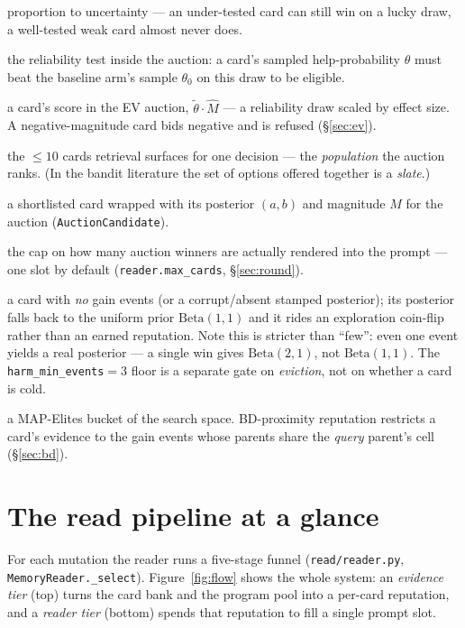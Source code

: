 \documentclass[11pt]{article}
\newcommand{\code}[1]{\texttt{\small #1}}
\newcommand{\Beta}{\mathrm{Beta}}
\begin{document}
\begin{description}[leftmargin=1.4em, itemsep=1.5pt, parsep=0pt, style=unboxed]
    proportion to uncertainty --- an under-tested card can still win on a lucky draw,
    a well-tested weak card almost never does.
  \item[\textcolor{harmred}{Gate ($\theta>\theta_0$)}] the reliability test inside
    the auction: a card's sampled help-probability $\theta$ must beat the baseline
    arm's sample $\theta_0$ on this draw to be eligible.
  \item[\textcolor{harmred}{Bid / expected value (EV)}] a card's score in the EV
    auction, $\tilde\theta\cdot\hat M$ --- a reliability draw scaled by effect size.
    A negative-magnitude card bids negative and is refused (\S\ref{sec:ev}).
  \item[\textcolor{cardblue}{Shortlist (slate)}] the $\le 10$ cards retrieval
    surfaces for one decision --- the \emph{population} the auction ranks. (In the
    bandit literature the set of options offered together is a \emph{slate}.)
  \item[\textcolor{cardblue}{Candidate}] a shortlisted card wrapped with its
    posterior $(a,b)$ and magnitude $M$ for the auction (\code{AuctionCandidate}).
  \item[\textcolor{cardblue}{Budget}] the cap on how many auction winners are
    actually rendered into the prompt --- one slot by default
    (\code{reader.max\_cards}, \S\ref{sec:round}).
  \item[\textcolor{coldgray}{Cold card}] a card with \emph{no} gain events (or a
    corrupt/absent stamped posterior); its posterior falls back to the uniform prior
    $\Beta(1,1)$ and it rides an exploration coin-flip rather than an earned
    reputation. Note this is stricter than ``few'': even one event yields a real
    posterior --- a single win gives $\Beta(2,1)$, not $\Beta(1,1)$. The
    \code{harm\_min\_events}${=}3$ floor is a separate gate on \emph{eviction}, not
    on whether a card is cold.
  \item[\textcolor{coldgray}{Cell (behavioral descriptor)}] a MAP-Elites bucket of
    the search space. BD-proximity reputation restricts a card's evidence to the
    gain events whose parents share the \emph{query} parent's cell (\S\ref{sec:bd}).
\end{description}
\endgroup

\section{The read pipeline at a glance}

For each mutation the reader runs a five-stage funnel
(\code{read/reader.py}, \code{MemoryReader.\_select}). Figure~\ref{fig:flow}
shows the whole system: an \emph{evidence tier} (top) turns the card bank and the
program pool into a per-card reputation, and a \emph{reader tier} (bottom) spends
that reputation to fill a single prompt slot.
\end{document}
